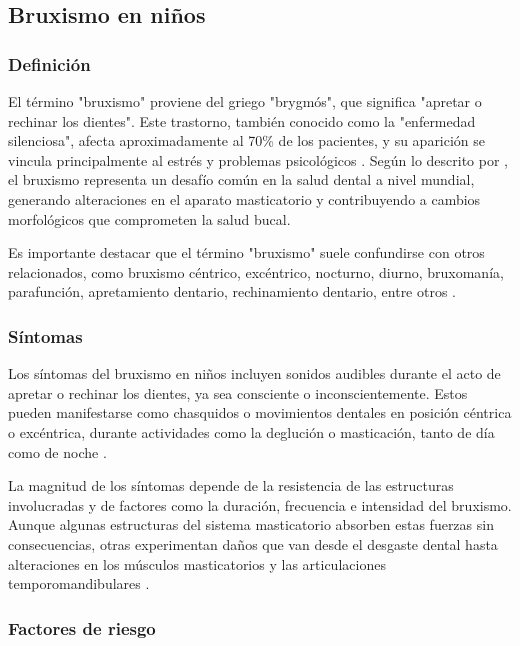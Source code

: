 \subsection{Bruxismo en niños}

\subsubsection{Definición}

El término "bruxismo" proviene del griego "brygmós", que significa "apretar o rechinar los dientes". Este trastorno, también conocido como la "enfermedad silenciosa", afecta aproximadamente al 70\% de los pacientes, y su aparición se vincula principalmente al estrés y problemas psicológicos \parencite{Rojas2022}. Según lo descrito por \textcite{Rojas2022}, el bruxismo representa un desafío común en la salud dental a nivel mundial, generando alteraciones en el aparato masticatorio y contribuyendo a cambios morfológicos que comprometen la salud bucal.

Es importante destacar que el término "bruxismo" suele confundirse con otros relacionados, como bruxismo céntrico, excéntrico, nocturno, diurno, bruxomanía, parafunción, apretamiento dentario, rechinamiento dentario, entre otros \parencite{Zambra2003}.

\subsubsection{Síntomas}

Los síntomas del bruxismo en niños incluyen sonidos audibles durante el acto de apretar o rechinar los dientes, ya sea consciente o inconscientemente. Estos pueden manifestarse como chasquidos o movimientos dentales en posición céntrica o excéntrica, durante actividades como la deglución o masticación, tanto de día como de noche \parencite{vallejo2002bruxismoinfantil}. 

La magnitud de los síntomas depende de la resistencia de las estructuras involucradas y de factores como la duración, frecuencia e intensidad del bruxismo. Aunque algunas estructuras del sistema masticatorio absorben estas fuerzas sin consecuencias, otras experimentan daños que van desde el desgaste dental hasta alteraciones en los músculos masticatorios y las articulaciones temporomandibulares \parencite{vallejo2002bruxismoinfantil}.

\subsubsection{Factores de riesgo}

